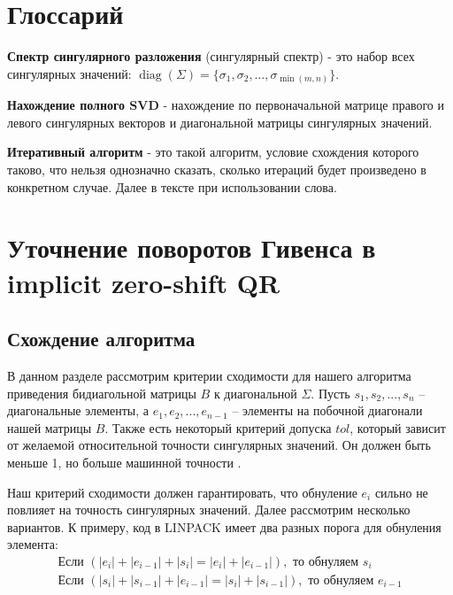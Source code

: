 \documentclass[12pt, a4paper]{report}
\theoremstyle{note}
\begin{document}
\tableofcontents


\newpage
\section{Глоссарий}

\hspace{0.45cm} \textbf{Спектр сингулярного разложения} (сингулярный спектр) - это набор всех сингулярных значений: \( \operatorname{diag}(\Sigma) = \{ \sigma_1, \sigma_2, \dots, \sigma_{\min(m, n)} \} \).

\textbf{Нахождение полного SVD} - нахождение по первоначальной матрице правого и левого сингулярных векторов и диагональной матрицы сингулярных значений. 

\textbf{Итеративный алгоритм} - это такой алгоритм, условие схождения которого таково, что нельзя однозначно сказать, сколько итераций будет произведено в конкретном случае. Далее в тексте при использовании слова. 
\section{Уточнение поворотов Гивенса в implicit zero-shift QR}

\subsection{Схождение алгоритма}
В данном разделе рассмотрим критерии сходимости для нашего алгоритма приведения бидиагольной матрицы $B$ к диагональной $\Sigma$. Пусть $s_1, s_2,...,s_n$ \--- диагональные элементы, а $e_1, e_2, ..., e_{n-1}$ \--- элементы на побочной диагонали нашей матрицы $B$. Также есть некоторый критерий допуска $tol$, который зависит от желаемой относительной точности сингулярных значений. Он должен быть меньше 1, но больше машинной точности \epsilon.

Наш критерий сходимости должен гарантировать, что обнуление $e_i$ сильно не повлияет на точность сингулярных значений. Далее рассмотрим несколько вариантов. К примеру, код в LINPACK имеет два разных порога для обнуления элемента:
\begin{align}
\text{Если } (|e_i| + |e_{i-1}| + |s_i| = |e_i| + |e_{i-1}|), \text{ то обнуляем }s_i
\\\text{Если } (|s_i| + |s_{i-1}| + |e_{i-1}| = |s_i| + |s_{i-1}|), \text{ то обнуляем }e_{i-1}
\end{align}
\end{document}
